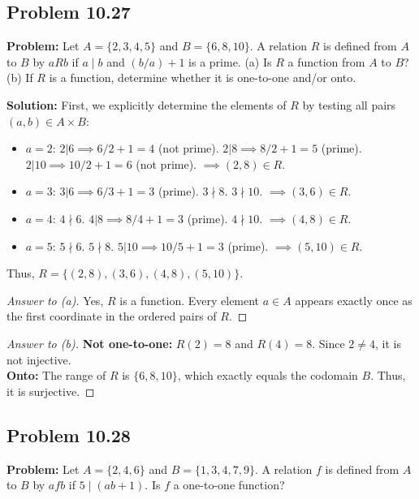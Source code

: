 \documentclass[11pt, a4paper]{article}
\theoremstyle{definition}
\theoremstyle{remark}
\begin{document}
\subsection{Problem 10.27}
\textbf{Problem:} Let $A = \{2, 3, 4, 5\}$ and $B = \{6, 8, 10\}$. A relation $R$ is defined from $A$ to $B$ by $aRb$ if $a \mid b$ and $(b/a) + 1$ is a prime. (a) Is $R$ a function from $A$ to $B$? (b) If $R$ is a function, determine whether it is one-to-one and/or onto.

\textbf{Solution:}
First, we explicitly determine the elements of $R$ by testing all pairs $(a,b) \in A \times B$:
\begin{itemize}
    \item $a=2$: $2|6 \implies 6/2+1=4$ (not prime). $2|8 \implies 8/2+1=5$ (prime). $2|10 \implies 10/2+1=6$ (not prime). $\implies (2,8) \in R$.
    \item $a=3$: $3|6 \implies 6/3+1=3$ (prime). $3 \nmid 8$. $3 \nmid 10$. $\implies (3,6) \in R$.
    \item $a=4$: $4 \nmid 6$. $4|8 \implies 8/4+1=3$ (prime). $4 \nmid 10$. $\implies (4,8) \in R$.
    \item $a=5$: $5 \nmid 6$. $5 \nmid 8$. $5|10 \implies 10/5+1=3$ (prime). $\implies (5,10) \in R$.
\end{itemize}
Thus, $R = \{(2,8), (3,6), (4,8), (5,10)\}$.

\begin{proof}[Answer to (a)]
Yes, $R$ is a function. Every element $a \in A$ appears exactly once as the first coordinate in the ordered pairs of $R$.
\end{proof}

\begin{proof}[Answer to (b)]
\textbf{Not one-to-one:} $R(2) = 8$ and $R(4) = 8$. Since $2 \neq 4$, it is not injective. \\
\textbf{Onto:} The range of $R$ is $\{6, 8, 10\}$, which exactly equals the codomain $B$. Thus, it is surjective.
\end{proof}

\subsection{Problem 10.28}
\textbf{Problem:} Let $A = \{2, 4, 6\}$ and $B = \{1, 3, 4, 7, 9\}$. A relation $f$ is defined from $A$ to $B$ by $afb$ if $5 \mid (ab + 1)$. Is $f$ a one-to-one function?
\end{document}
